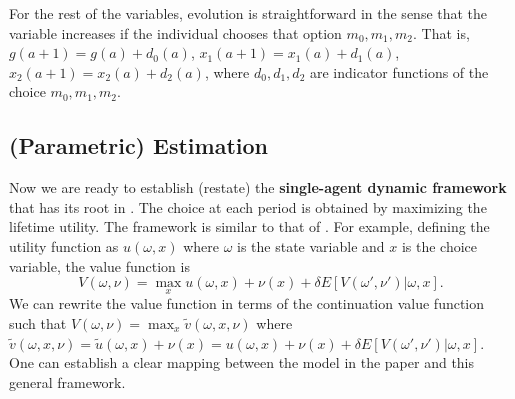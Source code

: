 \documentclass[12pt]{article}
\begin{document}
For the rest of the variables, evolution is straightforward in the sense that the variable increases if the individual chooses that option $m_0, m_1, m_2$. That is, 
$g(a+1) = g(a) + d_0(a)$, $x_1(a+1) = x_1(a) + d_1(a)$, $x_2(a+1) = x_2(a) + d_2(a)$, where $d_0, d_1, d_2$ are indicator functions of the choice $m_0, m_1, m_2$.

\subsection{(Parametric) Estimation} Now we are ready to establish (restate) the \textbf{single-agent dynamic framework} that has its root in \cite{rust1987optimal}. The choice at each period is obtained by maximizing the lifetime utility. The framework is similar to that of \cite{rust1987optimal}. For example, defining the utility function as $u(\omega, x)$ where $\omega$ is the state variable and $x$ is the choice variable, the value function is
$$V(\omega, \nu) = \max_x u(\omega, x) + \nu(x) + \delta E[V(\omega', \nu')|\omega, x].$$
We can rewrite the value function in terms of the continuation value function such that $V(\omega, \nu) = \max_x \tilde{v}(\omega, x, \nu)$ where $\tilde{v}(\omega, x, \nu) = \tilde{u}(\omega, x) + \nu(x) = u(\omega, x) + \nu(x) + \delta E[V(\omega', \nu')|\omega, x]$. One can establish a clear mapping between the model in the paper and this general framework.
\end{document}
